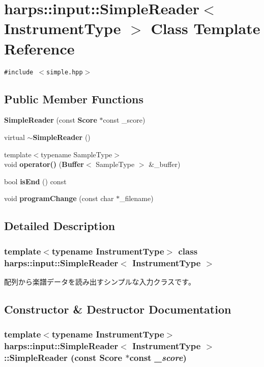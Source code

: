 \section{harps::input::SimpleReader$<$ InstrumentType $>$ Class Template Reference}
\label{classharps_1_1input_1_1SimpleReader}
{\tt \#include $<$simple.hpp$>$}

\subsection*{Public Member Functions}
\begin{CompactItemize}
\item 
{\bf SimpleReader} (const {\bf Score} $\ast$const \_\-score)
\item 
virtual {\bf $\sim$SimpleReader} ()
\item 
{\footnotesize template$<$typename SampleType$>$ }\\void {\bf operator()} ({\bf Buffer}$<$ SampleType $>$ \&\_\-buffer)
\item 
bool {\bf isEnd} () const 
\item 
void {\bf programChange} (const char $\ast$\_\-filename)
\end{CompactItemize}


\subsection{Detailed Description}
\subsubsection*{template$<$typename InstrumentType$>$ class harps::input::SimpleReader$<$ InstrumentType $>$}

配列から楽譜データを読み出すシンプルな入力クラスです。 

\subsection{Constructor \& Destructor Documentation}
\subsubsection[SimpleReader]{\setlength{\rightskip}{0pt plus 5cm}template$<$typename InstrumentType$>$ {\bf harps::input::SimpleReader}$<$ InstrumentType $>$::{\bf SimpleReader} (const {\bf Score} $\ast$const  {\em \_\-score})\hspace{0.3cm}{\tt  [inline]}}\label{classharps_1_1input_1_1SimpleReader_329c834a56b19251d39d127a78f45750}


